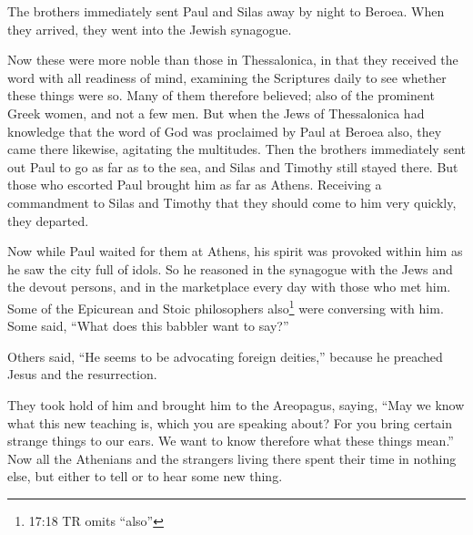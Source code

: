  The brothers immediately sent Paul and Silas away by night
to Beroea. When they arrived, they went into the Jewish synagogue.

 Now these were more noble than those in Thessalonica, in
that they received the word with all readiness of mind, examining the
Scriptures daily to see whether these things were so.  Many
of them therefore believed; also of the prominent Greek women, and not a
few men.  But when the Jews of Thessalonica had knowledge
that the word of God was proclaimed by Paul at Beroea also, they came
there likewise, agitating the multitudes.  Then the
brothers immediately sent out Paul to go as far as to the sea, and Silas
and Timothy still stayed there.  But those who escorted
Paul brought him as far as Athens. Receiving a commandment to Silas and
Timothy that they should come to him very quickly, they departed.

 Now while Paul waited for them at Athens, his spirit was
provoked within him as he saw the city full of idols.  So
he reasoned in the synagogue with the Jews and the devout persons, and
in the marketplace every day with those who met him.  Some
of the Epicurean and Stoic philosophers also\footnote{17:18 TR omits
  ``also''} were conversing with him. Some said, ``What does this
babbler want to say?''

Others said, ``He seems to be advocating foreign deities,'' because he
preached Jesus and the resurrection.

 They took hold of him and brought him to the Areopagus,
saying, ``May we know what this new teaching is, which you are speaking
about?  For you bring certain strange things to our ears.
We want to know therefore what these things mean.''  Now
all the Athenians and the strangers living there spent their time in
nothing else, but either to tell or to hear some new thing.

